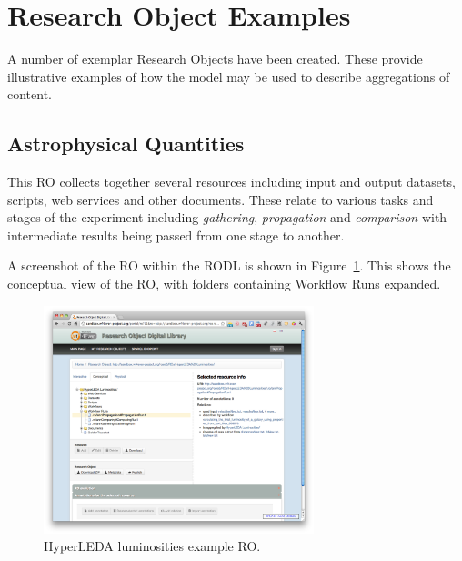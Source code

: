 \newcommand{\picwidth}{0.7\textwidth}

\section{Research Object Examples}
\label{sec:examples}

A number of exemplar Research Objects have been created. These
provide illustrative examples of how the model may be used to describe
aggregations of content. 

\subsection{Astrophysical Quantities}

This RO collects together several resources including input and output
datasets, scripts, web services and other documents. These relate to
various tasks and stages of the experiment including
\emph{gathering}, \emph{propagation} and \emph{comparison} with
intermediate results being passed from one stage to another. 

A screenshot of the RO within the RODL is shown in
Figure~\ref{fig:hyperleda}. This shows the conceptual view of the RO,
with folders containing Workflow Runs expanded.

\begin{figure}[h]
  \centering
  \includegraphics[width=\picwidth]{Figures/HyperLEDA}
  \caption{HyperLEDA luminosities example RO.}
  \label{fig:hyperleda}
\end{figure}

